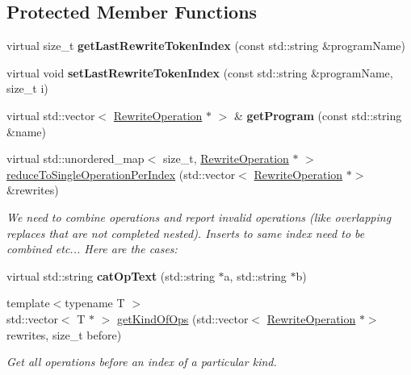 \subsection*{Protected Member Functions}
\begin{DoxyCompactItemize}
\item 
\mbox{\label{classantlr4_1_1TokenStreamRewriter_ad9b8a5de0a69b4008e562e03bdc084c5}} 
virtual size\+\_\+t {\bfseries get\+Last\+Rewrite\+Token\+Index} (const std\+::string \&program\+Name)
\item 
\mbox{\label{classantlr4_1_1TokenStreamRewriter_a9d27faed050312028ecf10ee0a2c8f14}} 
virtual void {\bfseries set\+Last\+Rewrite\+Token\+Index} (const std\+::string \&program\+Name, size\+\_\+t i)
\item 
\mbox{\label{classantlr4_1_1TokenStreamRewriter_ae763b75d6754f62c2729efb16665b742}} 
virtual std\+::vector$<$ \hyperlink{classantlr4_1_1TokenStreamRewriter_1_1RewriteOperation}{Rewrite\+Operation} $\ast$ $>$ \& {\bfseries get\+Program} (const std\+::string \&name)
\item 
virtual std\+::unordered\+\_\+map$<$ size\+\_\+t, \hyperlink{classantlr4_1_1TokenStreamRewriter_1_1RewriteOperation}{Rewrite\+Operation} $\ast$ $>$ \hyperlink{classantlr4_1_1TokenStreamRewriter_a3c2c5242784157838416bd1ef18755cf}{reduce\+To\+Single\+Operation\+Per\+Index} (std\+::vector$<$ \hyperlink{classantlr4_1_1TokenStreamRewriter_1_1RewriteOperation}{Rewrite\+Operation} $\ast$$>$ \&rewrites)
\begin{DoxyCompactList}\small\item\em We need to combine operations and report invalid operations (like overlapping replaces that are not completed nested). Inserts to same index need to be combined etc... Here are the cases\+: \end{DoxyCompactList}\item 
\mbox{\label{classantlr4_1_1TokenStreamRewriter_ae9165dab5d6898f290a86069e59c1662}} 
virtual std\+::string {\bfseries cat\+Op\+Text} (std\+::string $\ast$a, std\+::string $\ast$b)
\item 
\mbox{\label{classantlr4_1_1TokenStreamRewriter_ad49f46da4de266eee4373da5d5174644}} 
{\footnotesize template$<$typename T $>$ }\\std\+::vector$<$ T $\ast$ $>$ \hyperlink{classantlr4_1_1TokenStreamRewriter_ad49f46da4de266eee4373da5d5174644}{get\+Kind\+Of\+Ops} (std\+::vector$<$ \hyperlink{classantlr4_1_1TokenStreamRewriter_1_1RewriteOperation}{Rewrite\+Operation} $\ast$$>$ rewrites, size\+\_\+t before)
\begin{DoxyCompactList}\small\item\em Get all operations before an index of a particular kind. \end{DoxyCompactList}\end{DoxyCompactItemize}
